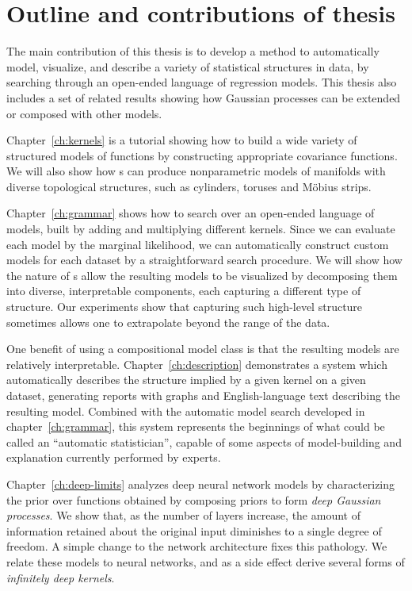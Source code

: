 \section{Outline and contributions of thesis}

The main contribution of this thesis is to develop a method to automatically model, visualize, and describe a variety of statistical structures in data, by searching through an open-ended language of regression models.
This thesis also includes a set of related results showing how Gaussian processes can be extended or composed with other models.

Chapter~\ref{ch:kernels} is a tutorial showing how to build a wide variety of structured models of functions by constructing appropriate covariance functions.
We will also show how \gp{}s can produce nonparametric models of manifolds with diverse topological structures, such as cylinders, toruses and M\"obius strips.

Chapter~\ref{ch:grammar} shows how to search over an open-ended language of models, built by adding and multiplying different kernels.
Since we can evaluate each model by the marginal likelihood, we can automatically construct custom models for each dataset by a straightforward search procedure.
We will show how the nature of \gp{}s allow the resulting models to be visualized by decomposing them into diverse, interpretable components, each capturing a different type of structure.
Our experiments show that capturing such high-level structure sometimes allows one to extrapolate beyond the range of the data.

One benefit of using a compositional model class is that the resulting models are relatively interpretable.
Chapter~\ref{ch:description} demonstrates a system which automatically describes the structure implied by a given kernel on a given dataset, generating reports with graphs and English-language text describing the resulting model.
Combined with the automatic model search developed in chapter~\ref{ch:grammar}, this system represents the beginnings of what could be called an ``automatic statistician'', capable of some aspects of model-building and explanation currently performed by experts.

Chapter~\ref{ch:deep-limits} analyzes deep neural network models by characterizing the prior over functions obtained by composing \gp{} priors to form \emph{deep Gaussian processes}.
We show that, as the number of layers increase, the amount of information retained about the original input diminishes to a single degree of freedom.
A simple change to the network architecture fixes this pathology.
We relate these models to neural networks, and as a side effect derive several forms of \emph{infinitely deep kernels}.

